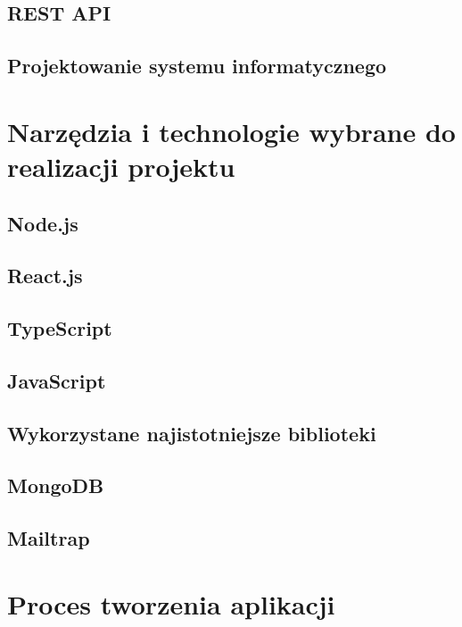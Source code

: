 \documentclass[12pt]{article}
\begin{document}
\begin{sloppypar}
{\subsection{REST API}
{

}
\subsection{Projektowanie systemu informatycznego}
{

}
}

\section{Narzędzia i technologie wybrane do realizacji projektu}
{
\subsection{Node.js}
{

}
\subsection{React.js}
{

}
\subsection{TypeScript}
{

}
\subsection{JavaScript}
{

}
\subsection{Wykorzystane najistotniejsze biblioteki}
{

}
\subsection{MongoDB}
{

}
\subsection{Mailtrap}
{

}
}

\section{Proces tworzenia aplikacji}
{

}
\end{sloppypar}
\end{document}
